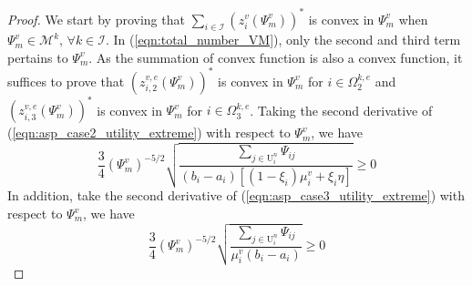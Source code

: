 \documentclass[conference]{IEEEtran}
\begin{document}
\begin{proof}
We start by proving that $\sum_{i \in \mathcal{I}} (z_{i}^v(\Psi_m^v))^*$ is convex in $\Psi_m^v$ when $\Psi_m^v \in \mathcal{M}^k,\, \forall k \in \mathcal{I}$. In (\ref{eqn:total_number_VM}), only the second and third term pertains to $\Psi_m^v$. As the summation of convex function is also a convex function, it suffices to prove that $(z_{i,2}^{v,e}(\Psi_m^v))^*$ is convex in $\Psi_m^v$ for $i \in \Omega_2^{k,e}$ and $(z_{i,3}^{v,e}(\Psi_m^v))^*$ is convex in $\Psi_m^v$ for $i \in \Omega_3^{k,e}$. Taking the second derivative of (\ref{eqn:asp_case2_utility_extreme}) with respect to $\Psi_m^v$, we have
\begin{equation}
\frac{3}{4}(\Psi_m^v)^{-5/2}\sqrt{\frac{\sum_{j \in \mathrm{U}_i^n}\Psi_{ij}}{(b_i-a_i)[(1-\xi_i)\mu_i^v + \xi_i \eta]}} \geq 0
\end{equation}
In addition, take the second derivative of (\ref{eqn:asp_case3_utility_extreme}) with respect to $\Psi_m^v$, we have
\begin{equation}
\frac{3}{4}(\Psi_m^v)^{-5/2}\sqrt{\frac{\sum_{j \in \mathrm{U}_i^n}\Psi_{ij}}{\mu_i^v(b_i-a_i)}} \geq 0
\end{equation}


\end{proof}
\end{document}
